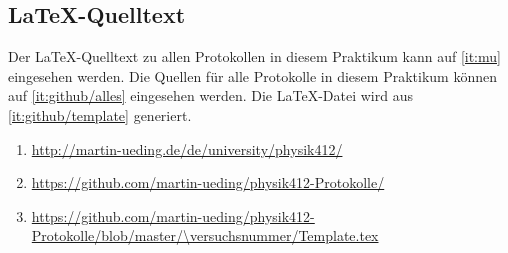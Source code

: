 
\FloatBarrier
\begin{appendix}
    \FloatBarrier
    \chapter{\LaTeX-Quelltext}

    Der \LaTeX-Quelltext zu allen Protokollen in diesem Praktikum kann auf
    \ref{it:mu} eingesehen werden. Die Quellen für alle Protokolle in diesem
    Praktikum können auf \ref{it:github/alles} eingesehen werden. Die
    \LaTeX-Datei wird aus \ref{it:github/template} generiert.

    \begin{enumerate}
        \item
            \label{it:mu}
            \url{http://martin-ueding.de/de/university/physik412/}
        \item
            \label{it:github/alles}
            \url{https://github.com/martin-ueding/physik412-Protokolle/}
        \item
            \label{it:github/template}
            \url{https://github.com/martin-ueding/physik412-Protokolle/blob/master/\versuchsnummer/Template.tex}
    \end{enumerate}
\end{appendix}


\FloatBarrier
\printbibliography



